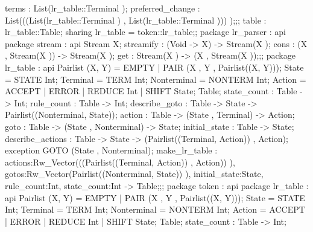 {{{                            terms : List(lr_table::Terminal );
                            preferred_change : List(((List(lr_table::Terminal ) , List(lr_table::Terminal ))) );};;
                table : lr_table::Table;
            sharing lr_table = token::lr_table};;
        package lr_parser
          : api {   package stream
                      : api {
                            Stream X;
                            streamify : (Void -> X) -> Stream(X );
                            cons : (X , Stream(X )) -> Stream(X );
                            get : Stream(X ) -> (X , Stream(X ));};;
                    package lr_table
                      : api {
                            Pairlist (X, Y) = EMPTY | PAIR (X , Y , Pairlist((X, Y)));
                            State  = STATE Int;
                            Terminal  = TERM Int;
                            Nonterminal  = NONTERM Int;
                            Action  = ACCEPT | ERROR | REDUCE Int | SHIFT State;
                            Table;
                            state_count : Table -> Int;
                            rule_count : Table -> Int;
                            describe_goto : Table -> State -> Pairlist((Nonterminal, State));
                            action : Table -> (State , Terminal) -> Action;
                            goto : Table -> (State , Nonterminal) -> State;
                            initial_state : Table -> State;
                            describe_actions : Table -> State -> (Pairlist((Terminal, Action)) , Action);
                            exception GOTO (State , Nonterminal);
                                make_lr_table :
                                        {actions:Rw_Vector(((Pairlist((Terminal, Action)) , Action)) ),
                                        gotos:Rw_Vector(Pairlist((Nonterminal, State)) ), initial_state:State, rule_count:Int,
                                        state_count:Int}
                                    ->
                                    Table;};;
                    package token
                      : api {   package lr_table
                                  : api {
                                        Pairlist (X, Y) = EMPTY | PAIR (X , Y , Pairlist((X, Y)));
                                        State  = STATE Int;
                                        Terminal  = TERM Int;
                                        Nonterminal  = NONTERM Int;
                                        Action  = ACCEPT | ERROR | REDUCE Int | SHIFT State;
                                        Table;
                                        state_count : Table -> Int;
}}}}
